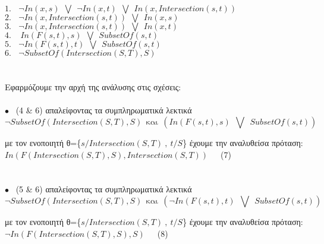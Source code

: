 \documentclass[10pt]{article}
\begin{document}
 $ 1. \ \ \ \ 
 \neg  In(x,s) \ \ \bigvee \ \  \neg In(x,t) \ \ \bigvee  \ \ In( x, Intersection(s,t))$ \\

$ 2. \ \ \ \ 
 \neg In( x, Intersection(s,t)) \ \ \bigvee \ \  In(x,s)$ \\

$ 3. \ \ \ \ 
\neg In( x, Intersection(s,t)) \ \ \bigvee \ \  In(x,t) $ \\

$ 4. \ \ \ \
 \   In(F(s,t),s) \ \ \bigvee \ \  SubsetOf(s,t)$ \\

$ 5. \ \ \ \
  \neg In(F(s,t),t) \ \ \bigvee \ \  SubsetOf(s,t)$\\

$ 6. \ \ \ \ \neg 
 SubsetOf(Intersection(S,T),S)$ \\ \\ \\

 Εφαρμόζουμε την αρχή της ανάλυσης στις σχέσεις: \\ \\ 

$\bullet$ \ (4 \&  6) απαλείφοντας τα συμπληρωματικά λεκτικά  \\
\[
\neg SubsetOf(Intersection(S,T),S) \ \ \text{και} \ \ \left( In(F(s,t),s) \ \ \bigvee \ \ SubsetOf(s,t) \right) 
\] 

\hspace{5mm} με τον ενοποιητή θ=\{$s/Intersection(S,T) \ , \ t/S$\} έχουμε την αναλυθείσα πρόταση: \\

\hspace{60mm} $ In(F(Intersection(S,T),S),Intersection(S,T))$\ \ \  (7) \\ \\  \\

$\bullet$ \ (5 \&  6) απαλείφοντας τα συμπληρωματικά λεκτικά  \\
\[
\neg SubsetOf(Intersection(S,T),S) \ \ \text{και} \ \ \left( \neg In(F(s,t),t) \ \ \bigvee \ \ SubsetOf(s,t) \right) 
\] 

\hspace{5mm} με τον ενοποιητή θ=\{$s/Intersection(S,T) \ , \ t/S$\} έχουμε την αναλυθείσα πρόταση: \\

\hspace{60mm} $\neg In(F(Intersection(S,T),S),S)$\ \ \  (8) \\ \\  \\
\end{document}
